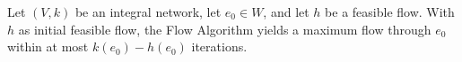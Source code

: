 Let $(V, k)$ be an integral network, let $e_0 \in W$, and let $h$ be a feasible flow. With $h$ as initial feasible flow, the Flow Algorithm yields a maximum flow through $e_0$ within at most $k(e_0) - h(e_0)$ iterations.
